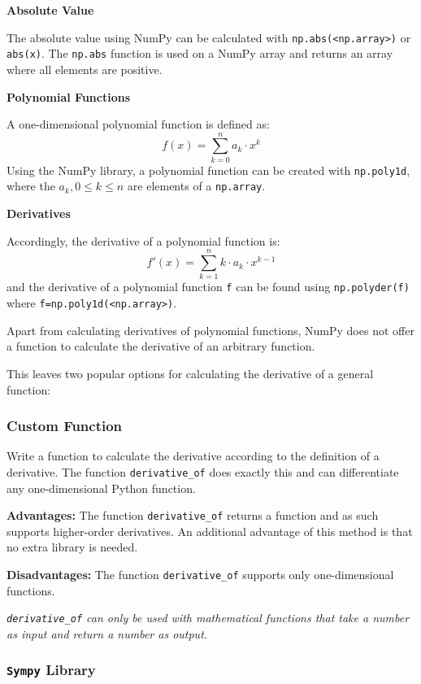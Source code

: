 \documentclass[11pt]{article}
\begin{document}
\textbf{Absolute Value}

The absolute value using NumPy can be calculated with
\texttt{np.abs(\textless{}np.array\textgreater{})} or \texttt{abs(x)}.
The \texttt{np.abs} function is used on a NumPy array and returns an
array where all elements are positive.

\textbf{Polynomial Functions}

A one-dimensional polynomial function is defined as:
\[f(x)=\sum_{k=0}^{n} a_k \cdot x^k\] Using the NumPy library, a
polynomial function can be created with \texttt{np.poly1d}, where the
\(a_k, 0 \leq k \leq n\) are elements of a \texttt{np.array}.

\textbf{Derivatives}

Accordingly, the derivative of a polynomial function is:
\[f'(x) = \sum_{k=1}^{n} k \cdot a_k \cdot x^{k-1}\] and the derivative
of a polynomial function \texttt{f} can be found using
\texttt{np.polyder(f)} where
\texttt{f=np.poly1d(\textless{}np.array\textgreater{})}.

Apart from calculating derivatives of polynomial functions, NumPy does
not offer a function to calculate the derivative of an arbitrary
function.

This leaves two popular options for calculating the derivative of a
general function:

\subsubsection{Custom Function}\label{custom-function}

Write a function to calculate the derivative according to the definition
of a derivative. The function \texttt{derivative\_of} does exactly this
and can differentiate any one-dimensional Python function.

\textbf{Advantages:} The function \texttt{derivative\_of} returns a
function and as such supports higher-order derivatives. An additional
advantage of this method is that no extra library is needed.

\textbf{Disadvantages:} The function \texttt{derivative\_of} supports
only one-dimensional functions.

\emph{\texttt{derivative\_of} can only be used with mathematical
functions that take a number as input and return a number as output.}

\subsubsection{\texorpdfstring{\texttt{Sympy}
Library}{Sympy Library}}\label{sympy-library}
\end{document}
